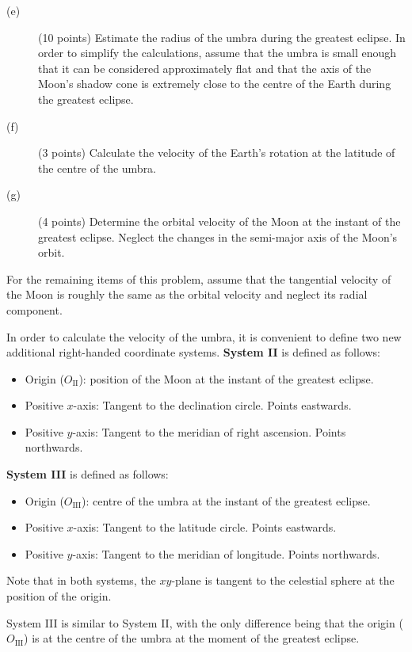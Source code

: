 \begin{description}
\item[(e)] (10 points) Estimate the radius of the umbra during the greatest
  eclipse. In order to simplify the calculations, assume that the umbra is
  small enough that it can be considered approximately flat and that the axis
  of the Moon's shadow cone is extremely close to the centre of the Earth
  during the greatest eclipse.
\item[(f)] (3 points) Calculate the velocity of the Earth's rotation at the
  latitude of the centre of the umbra.
\item[(g)] (4 points) Determine the orbital velocity of the Moon at the
  instant of the greatest eclipse. Neglect the changes in the semi-major axis
  of the Moon's orbit.
\end{description}

For the remaining items of this problem, assume that the tangential velocity
of the Moon is roughly the same as the orbital velocity and neglect its
radial component.

In order to calculate the velocity of the umbra, it is convenient to define
two new additional right-handed coordinate systems. \textbf{System II} is
defined as follows:
\begin{itemize}
\item Origin ($O_{\mathrm{II}}$): position of the Moon at the instant of the
  greatest eclipse.
\item Positive $x$-axis: Tangent to the declination circle. Points
  eastwards.
\item Positive $y$-axis: Tangent to the meridian of right ascension. Points
  northwards.
\end{itemize}

\textbf{System III} is defined as follows:
\begin{itemize}
\item Origin ($O_{\mathrm{III}}$): centre of the umbra at the instant of the
  greatest eclipse.
\item Positive $x$-axis: Tangent to the latitude circle. Points eastwards.
\item Positive $y$-axis: Tangent to the meridian of longitude. Points
  northwards.
\end{itemize}

Note that in both systems, the $xy$-plane is tangent to the celestial sphere
at the position of the origin.

System III is similar to System II, with the only difference being that the
origin ($O_{\mathrm{III}}$) is at the centre of the umbra at the moment of
the greatest eclipse.

